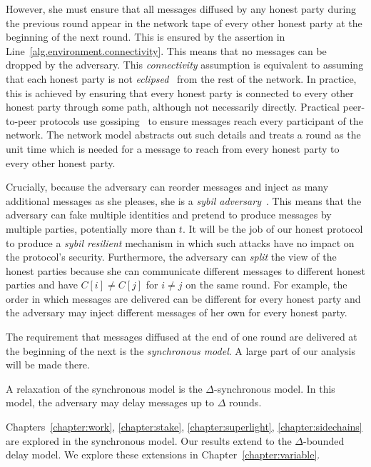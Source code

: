 However, she must ensure that all messages diffused by any honest party
during the previous round appear in the network tape of every other honest party
at the beginning of the next round. This is ensured by the assertion in Line~\ref{alg.environment.connectivity}. This means that no messages can be dropped
by the adversary. This \emph{connectivity} assumption is equivalent to assuming
that each honest party is not \emph{eclipsed}~\cite{eclipse,eclipse-ethereum}
from the rest of the network. In practice, this is achieved by ensuring that
every honest party is connected to every other honest party through some path,
although not necessarily directly. Practical peer-to-peer protocols use
gossiping~\cite{gossip} to ensure messages reach every participant of the network. The network
model abstracts out such details and treats a round as the unit time which is
needed for a message to reach from every honest party to every other honest
party.

Crucially, because the adversary can reorder messages and inject as many
additional messages as she pleases, she is a
\emph{sybil adversary}~\cite{sybil}. This means that the adversary can fake
multiple identities and pretend to produce messages by multiple parties,
potentially more than $t$. It will be the job of our honest protocol to produce
a \emph{sybil resilient} mechanism in which such attacks have no impact on the
protocol's security. Furthermore, the adversary can \emph{split} the view of the
honest parties because she can communicate different messages to different
honest parties and have $C[i] \neq C[j]$ for $i \neq j$ on the same round. For example, the order in which messages are delivered can be
different for every honest party and the adversary may inject different messages
of her own for every honest party.

The requirement that messages diffused at the end of one round are delivered at
the beginning of the next is the \emph{synchronous model}. A
large part of our analysis will be made there.

A relaxation of the synchronous model is the $\Delta$-synchronous model. In this
model, the adversary may delay messages up to $\Delta$ rounds.

Chapters~\ref{chapter:work},
\ref{chapter:stake}, \ref{chapter:superlight}, \ref{chapter:sidechains} are
explored in the synchronous model. Our results extend to the $\Delta$-bounded
delay model. We explore these extensions in Chapter~\ref{chapter:variable}.

